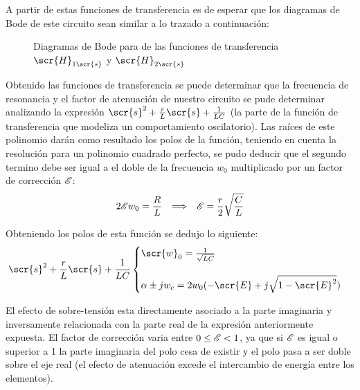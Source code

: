 A partir de estas funciones de transferencia es de esperar que los diagramas de Bode de este circuito sean similar a lo trazado a continuación:
\begin{figure}[H]
    \begin{minipage}{0.49\textwidth}
       
   \end{minipage}
   \begin{minipage}{0.49\textwidth}
       
   \end{minipage}
   \caption{Diagramas de Bode para de las funciones de transferencia $\scr{H}_{1\scr{s}}$ y $\scr{H}_{2\scr{s}}$}
   \label{fig:BodeTransExp3}
\end{figure}


 Obtenido las funciones de transferencia se puede determinar que la frecuencia de resonancia y el factor de atenuación de nuestro circuito se pude determinar analizando la expresión $\scr{s}^2+\frac{r}{L}\scr{s}+\frac{1}{LC}$ (la parte de la función de transferencia que modeliza un comportamiento oscilatorio). Las raíces de este polinomio darán como resultado los polos de la función, teniendo en cuenta la resolución para un polinomio cuadrado perfecto, se pudo deducir que el segundo termino debe ser igual a el doble de la frecuencia $w_0$ multiplicado por un factor de corrección $\mathscr{E}$:
\begin{equation}
2\mathscr{E}w_0=\frac{R}{L} \hspace{0.25cm} \Longrightarrow \hspace{0.25cm} \mathscr{E}=\frac{r}{2}\sqrt{\frac{C}{L}}
\end{equation}

Obteniendo los polos de esta función se dedujo lo siguiente:
 \begin{equation}
     \scr{s}^2+\frac{r}{L}\scr{s}+\frac{1}{LC}
     \begin{cases}
         \scr{w}_0=\frac{1}{\sqrt{LC}}\\
         \\
         \alpha\pm jw_{c}=2w_0(-\scr{E}+j\sqrt{1-\scr{E}^2})
     \end{cases}
 \end{equation}

El efecto de sobre-tensión esta directamente asociado a la parte imaginaria y inversamente relacionada con la parte real de la expresión anteriormente expuesta. El factor de corrección varia entre $0\leq\mathscr{E}<1$, ya que si $\mathscr{E}$ es igual o superior a 1 la parte imaginaria del polo cesa de existir y el polo pasa a ser doble sobre el eje real (el efecto de atenuación excede el intercambio de energía entre los elementos).

